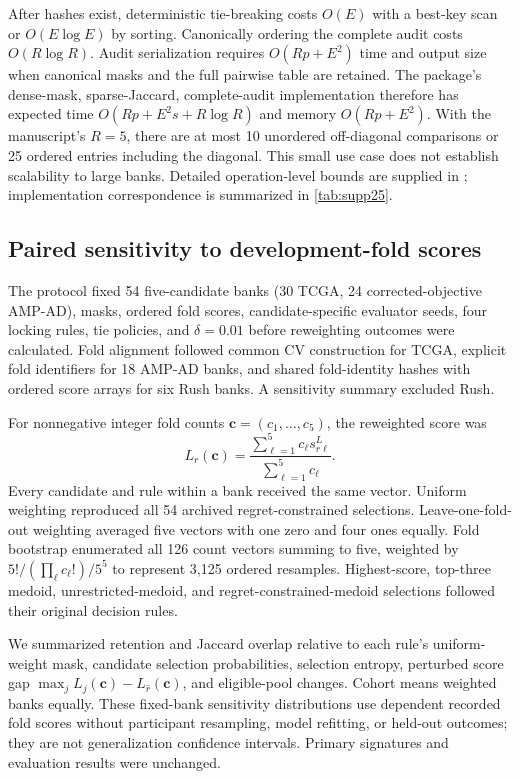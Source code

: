 After hashes exist, deterministic tie-breaking costs $O(E)$ with a best-key scan or $O(E\log E)$ by sorting. Canonically ordering the complete audit costs $O(R\log R)$. Audit serialization requires $O(Rp+E^2)$ time and output size when canonical masks and the full pairwise table are retained. The package's dense-mask, sparse-Jaccard, complete-audit implementation therefore has expected time $O(Rp+E^2s+R\log R)$ and memory $O(Rp+E^2)$. With the manuscript's $R=5$, there are at most 10 unordered off-diagonal comparisons or 25 ordered entries including the diagonal. This small use case does not establish scalability to large banks. Detailed operation-level bounds are supplied in ; implementation correspondence is summarized in \cref{tab:supp25}.


\clearpage
\subsection{Paired sensitivity to development-fold scores}

The protocol fixed 54 five-candidate banks (30 TCGA, 24 corrected-objective AMP-AD), masks, ordered fold scores, candidate-specific evaluator seeds, four locking rules, tie policies, and $\delta=0.01$ before reweighting outcomes were calculated. Fold alignment followed common CV construction for TCGA, explicit fold identifiers for 18 AMP-AD banks, and shared fold-identity hashes with ordered score arrays for six Rush banks. A sensitivity summary excluded Rush.

For nonnegative integer fold counts $\mathbf c=(c_1,\ldots,c_5)$, the reweighted score was
\begin{equation}
 L_r(\mathbf c)=\frac{\sum_{\ell=1}^{5}c_\ell s^L_{r\ell}}
 {\sum_{\ell=1}^{5}c_\ell}.
\end{equation}
Every candidate and rule within a bank received the same vector. Uniform weighting reproduced all 54 archived regret-constrained selections. Leave-one-fold-out weighting averaged five vectors with one zero and four ones equally. Fold bootstrap enumerated all 126 count vectors summing to five, weighted by $5!/(\prod_\ell c_\ell!)/5^5$ to represent 3,125 ordered resamples. Highest-score, top-three medoid, unrestricted-medoid, and regret-constrained-medoid selections followed their original decision rules.

We summarized retention and Jaccard overlap relative to each rule's uniform-weight mask, candidate selection probabilities, selection entropy, perturbed score gap $\max_j L_j(\mathbf c)-L_{\widehat r}(\mathbf c)$, and eligible-pool changes. Cohort means weighted banks equally. These fixed-bank sensitivity distributions use dependent recorded fold scores without participant resampling, model refitting, or held-out outcomes; they are not generalization confidence intervals. Primary signatures and evaluation results were unchanged.

